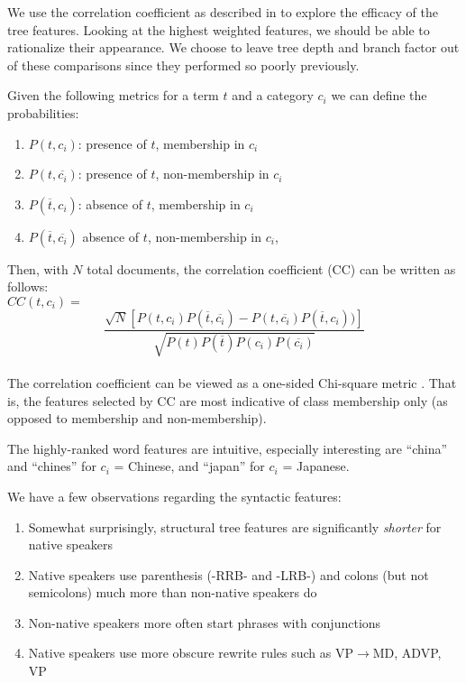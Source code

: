 \documentclass[conference]{IEEEtran}
\begin{document}
We use the correlation coefficient as described in \cite{sigir-ng-1997}
to explore the efficacy of the tree features. Looking at the highest weighted
features, we should be able to rationalize their appearance. We choose to leave
tree depth and branch factor out of these comparisons since they performed so
poorly previously.

Given the following metrics for a term $t$ and a category $c_i$ we can define
the probabilities:

\begin{enumerate}
    \item $P(t,c_i)$: presence of $t$, membership in $c_i$
    \item $P(t, \overline{c_i})$: presence of $t$, non-membership in $c_i$
    \item $P(\overline{t}, c_i)$: absence of $t$, membership in $c_i$
    \item $P(\overline{t}, \overline{c_i})$ absence of $t$, non-membership in
        $c_i$,
\end{enumerate}

Then, with $N$ total documents, the correlation coefficient (CC) can be written
as follows: \\

$CC(t, c_i) = $ \\
$$ \frac{\sqrt{N}[P(t,c_i)P(\overline{t},\overline{c_i}) - 
    P(t,\overline{c_i})P(\overline{t},c_i))]}
    {\sqrt{P(t)P(\overline{t})P(c_i)P(\overline{c_i})}} $$ \\

The correlation coefficient can be viewed as a one-sided Chi-square metric
\cite{sigkdd-zheng-2004}. That is, the features selected by CC are most
indicative of class membership only (as opposed to membership and
non-membership).



The highly-ranked word features are intuitive, especially interesting are
``china'' and ``chines'' for $c_i$ = Chinese, and ``japan'' for $c_i$ =
Japanese.

We have a few observations regarding the syntactic features:

\begin{enumerate}
    \item Somewhat surprisingly, structural tree features are significantly
        \emph{shorter} for native speakers
    \item Native speakers use parenthesis (-RRB- and -LRB-) and colons (but not
        semicolons) much more than non-native speakers do
    \item Non-native speakers more often start phrases with conjunctions
    \item Native speakers use more obscure rewrite rules such as
        VP$\rightarrow$MD, ADVP, VP
\end{enumerate}
\end{document}
